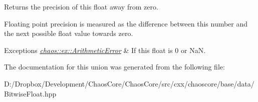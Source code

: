 Returns the precision of this float away from zero. 

Floating point precision is measured as the difference between this number and the next possible float value towards zero.


\begin{DoxyExceptions}{Exceptions}
{\em \hyperlink{classchaos_1_1ex_1_1_arithmetic_error}{chaos\+::ex\+::\+Arithmetic\+Error}} & If this float is 0 or Na\+N. \\
\hline
\end{DoxyExceptions}


The documentation for this union was generated from the following file\+:\begin{DoxyCompactItemize}
\item 
D\+:/\+Dropbox/\+Development/\+Chaos\+Core/\+Chaos\+Core/src/cxx/chaoscore/base/data/Bitwise\+Float.\+hpp\end{DoxyCompactItemize}
